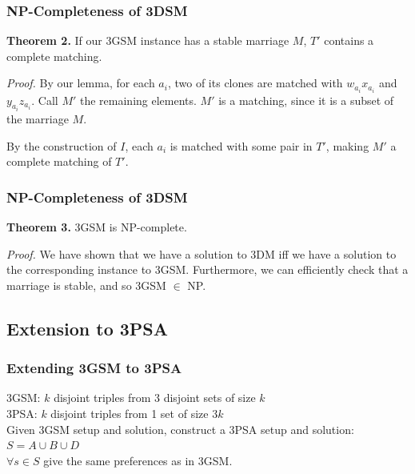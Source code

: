 \documentclass[mathserif,serif]{beamer}
\begin{document}
\begin{frame}
  \frametitle{NP-Completeness of 3DSM}
  \textbf{Theorem 2.} If our 3GSM instance has a stable marriage $M$, $T'$ contains a complete matching.

  \textit{Proof.} By our lemma, for each $a_i$, two of its clones are matched with $w_{a_i}x_{a_i}$ and $y_{a_i}z_{a_i}$. Call $M'$ the remaining elements. $M'$ is a matching, since it is a subset of the marriage $M$.

  By the construction of $I$, each $a_i$ is matched with some pair in $T'$, making $M'$ a complete matching of $T'$.
\end{frame}

\begin{frame}
  \frametitle{NP-Completeness of 3DSM}
  \textbf{Theorem 3.} 3GSM is NP-complete.

  \textit{Proof.} We have shown that we have a solution to 3DM iff we have a solution to the corresponding instance to 3GSM. Furthermore, we can efficiently check that a marriage is stable, and so 3GSM $\in$ NP.
\end{frame}


\subsection{Extension to 3PSA}

\begin{frame}
	\frametitle{Extending 3GSM to 3PSA}
	
	3GSM: $k$ disjoint triples from 3 disjoint sets of size $k$ \\
	3PSA: $k$ disjoint triples from 1 set of size $3k$\\
	\newline
	Given 3GSM setup and solution, construct a 3PSA setup and solution: \\
		$S = A \cup B \cup D$\\
		$\forall s \in S$ give the same preferences as in 3GSM.\\
		
\end{frame}
\end{document}
